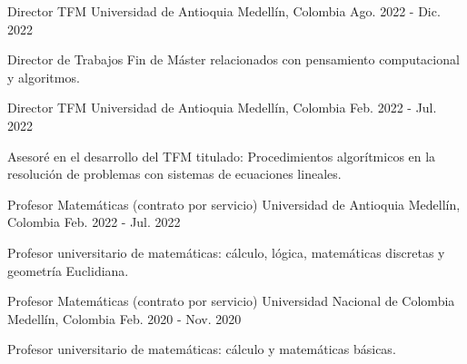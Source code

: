 
\begin{cventries}

\cventry
{Director TFM}
{Universidad de Antioquia}
{Medellín, Colombia}
{Ago. 2022 - Dic. 2022}
{
\begin{cvitems}
\item {Director de Trabajos Fin de Máster relacionados con pensamiento computacional y algoritmos.\hfill \break}
\end{cvitems}
}

\cventry
{Director TFM}
{Universidad de Antioquia}
{Medellín, Colombia}
{Feb. 2022 - Jul. 2022}
{
\begin{cvitems}
\item {Asesoré en el desarrollo del TFM titulado: Procedimientos algorítmicos en la resolución de problemas con sistemas de ecuaciones lineales.\hfill \break}
\end{cvitems}
}

\cventry
{Profesor Matemáticas (contrato por servicio)}
{Universidad de Antioquia}
{Medellín, Colombia}
{Feb. 2022 - Jul. 2022}
{
\begin{cvitems}
\item {Profesor universitario de matemáticas: cálculo, lógica, matemáticas discretas y geometría Euclidiana.\hfill \break}
\end{cvitems}
}

\cventry
{Profesor Matemáticas (contrato por servicio)}
{Universidad Nacional de Colombia}
{Medellín, Colombia}
{Feb. 2020 - Nov. 2020}
{
\begin{cvitems}
\item {Profesor universitario de matemáticas: cálculo y matemáticas básicas.\hfill \break}
\end{cvitems}
}

\end{cventries}
